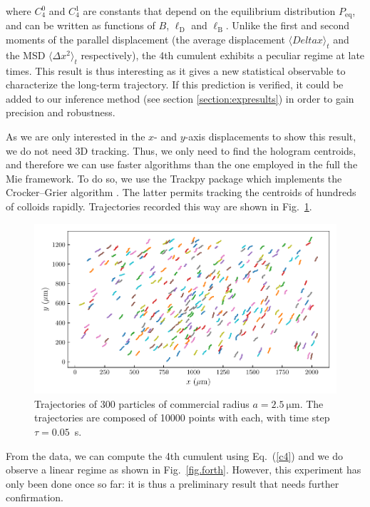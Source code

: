 where $ C_4 ^0$ and $ C_4 ^1$ are constants that depend on the equilibrium distribution $P_\mathrm{eq}$, and can be written as functions of $B$, $\ell _ \mathrm{D}$ and $\ell _\mathrm{B}$. Unlike the first and second moments of the parallel displacement (the average displacement $\langle Delta x \rangle_t$ and the \gls{MSD} $\langle \Delta x ^2 \rangle_t $ respectively), the 4th cumulent exhibits a peculiar regime at late times. This result is thus interesting as it gives a new statistical observable to characterize the long-term trajectory. If this prediction is verified, it could be added to our inference method (see section \ref{section:expresults}) in order to gain precision and robustness.

As we are only interested in the $x$- and $y$-axis displacements to show this result, we do not need 3D tracking. Thus, we only need to find the hologram centroids, and therefore we can use faster algorithms than the one employed in the full the Mie framework. To do so, we use the Trackpy package \href{https://github.com/soft-matter/trackpy}{\faGithub} \cite{allan_soft-mattertrackpy_2021} which implements the Crocker–Grier algorithm \cite{crocker_methods_1996}. The latter permits tracking the centroids of hundreds of colloids rapidly. Trajectories recorded this way are shown in Fig.~\ref{fig.trajtrackpy}.
\begin{figure}[H]
	\centering
	\includegraphics{02_body/chapter4/images/4th_cumulent/trajectories.pdf}
	\caption{Trajectories of 300 particles of commercial radius $a=2.5 ~ \mathrm{\mu m}$. The trajectories are composed of 10000 points with each, with time step $\tau = 0.05$~s. }
	\label{fig.trajtrackpy}
\end{figure}
From the data, we can compute the 4th cumulent using Eq.~(\ref{c4}) and we do observe a linear regime as shown in Fig.~\ref{fig.forth}. However, this experiment has only been done once so far: it is thus a preliminary result that needs further confirmation.
